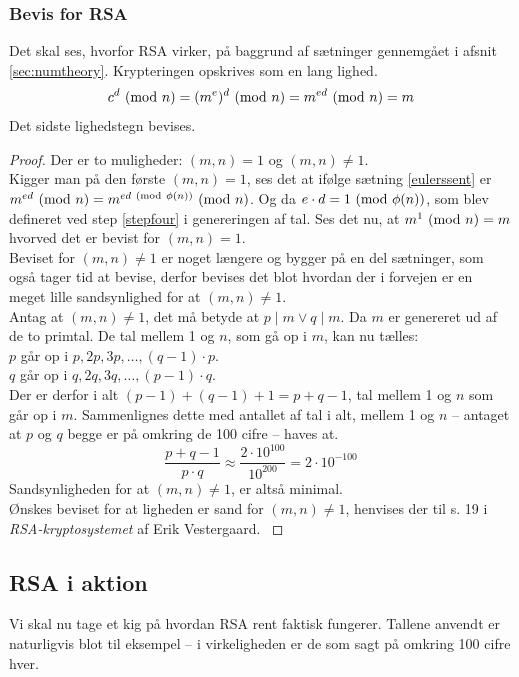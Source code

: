 \subsubsection{Bevis for RSA}
Det skal ses, hvorfor RSA virker, på baggrund af sætninger gennemgået i afsnit \ref{sec:numtheory}.
Krypteringen opskrives som en lang lighed.
\[c^d \ (\mathrm{mod}\ n) = (m^e)^d \ (\mathrm{mod}\ n) = m^{ed} \ (\mathrm{mod}\ n) = m\]
Det sidste lighedstegn bevises.
\begin{proof}
        Der er to muligheder: \((m, n) = 1\) og \((m, n) \neq 1\).\\
        Kigger man på den første \((m, n) = 1\), ses det at ifølge sætning \ref{eulerssent} er \(m^{ed} \ (\mathrm{mod}\ n) = m^{ed \ (\mathrm{mod}\ \phi(n))} \ (\mathrm{mod}\ n)\).
        Og da \(e \cdot d = 1 \ (\mathrm{mod}\ \phi(n))\), som blev defineret ved step \ref{stepfour} i genereringen af tal.
        Ses det nu, at \(m^1 \ (\mathrm{mod}\ n) = m\) hvorved det er bevist for \((m, n) = 1\).\\
        Beviset for \((m, n) \neq 1\) er noget længere og bygger på en del sætninger, som også tager tid at bevise, derfor bevises det blot hvordan der i forvejen er en meget lille sandsynlighed for at \((m, n) \neq 1\).\\
        Antag at \((m, n) \neq 1\), det må betyde at \(p \mid m \lor q \mid m\). Da \(m\) er genereret ud af de to primtal.
        De tal mellem 1 og \(n\), som gå op i \(m\), kan nu tælles:\\
        \(p\) går op i \(p, 2p, 3p, \hdots , (q - 1) \cdot p\).\\
        \(q\) går op i \(q, 2q, 3q, \hdots , (p - 1) \cdot q\).\\
        Der er derfor i alt \((p - 1) + (q - 1) + 1 = p + q - 1\), tal mellem 1 og \(n\) som går op i \(m\).
        Sammenlignes dette med antallet af tal i alt, mellem 1 og \(n\) -- antaget at \(p\) og \(q\) begge er på omkring de 100 cifre -- haves at.
        \[\frac{p + q - 1}{p \cdot q} \approx \frac{2 \cdot 10^{100}}{10^{200}} = 2 \cdot 10^{-100}\]
        Sandsynligheden for at \((m, n) \neq 1\), er altså minimal.\\
        Ønskes beviset for at ligheden er sand for \((m, n) \neq 1\), henvises der til s. 19 i \textit{RSA-kryptosystemet} af Erik Vestergaard. \cite[19]{vestergaard}
\end{proof}


\subsection{RSA i aktion}
Vi skal nu tage et kig på hvordan RSA rent faktisk fungerer.
Tallene anvendt er naturligvis blot til eksempel -- i virkeligheden er de som sagt på omkring 100 cifre hver.\\

